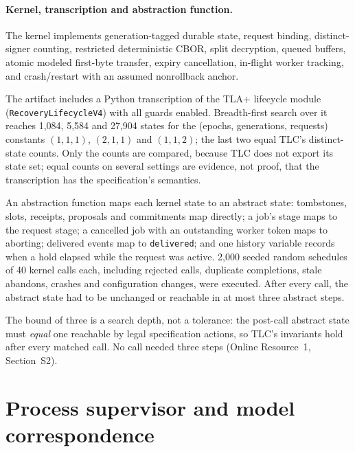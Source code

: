 \documentclass[pdflatex,sn-mathphys-num]{sn-jnl}
\newcommand{\code}[1]{\texttt{#1}}
\theoremstyle{plain}
\begin{document}
\paragraph{Kernel, transcription and abstraction function.}
The kernel implements generation-tagged durable state, request binding, distinct-signer counting, restricted deterministic CBOR, split decryption, queued buffers, atomic modeled first-byte transfer, expiry cancellation, in-flight worker tracking, and crash/restart with an assumed nonrollback anchor.

The artifact includes a Python transcription of the TLA+ lifecycle module (\code{RecoveryLifecycleV4}) with all guards enabled. Breadth-first search over it reaches 1,084, 5,584 and 27,904 states for the (epochs, generations, requests) constants $(1,1,1)$, $(2,1,1)$ and $(1,1,2)$; the last two equal TLC's distinct-state counts. Only the counts are compared, because TLC does not export its state set; equal counts on several settings are evidence, not proof, that the transcription has the specification's semantics.

An abstraction function maps each kernel state to an abstract state: tombstones, slots, receipts, proposals and commitments map directly; a job's stage maps to the request stage; a cancelled job with an outstanding worker token maps to aborting; delivered events map to \code{delivered}; and one history variable records when a hold elapsed while the request was active. 2,000 seeded random schedules of 40 kernel calls each, including rejected calls, duplicate completions, stale abandons, crashes and configuration changes, were executed. After every call, the abstract state had to be unchanged or reachable in at most three abstract steps.

The bound of three is a search depth, not a tolerance: the post-call abstract state must \emph{equal} one reachable by legal specification actions, so TLC's invariants hold after every matched call. No call needed three steps (Online Resource~1, Section~S2).

\section{Process supervisor and model correspondence}\label{sec:s-supervisor}
\end{document}
